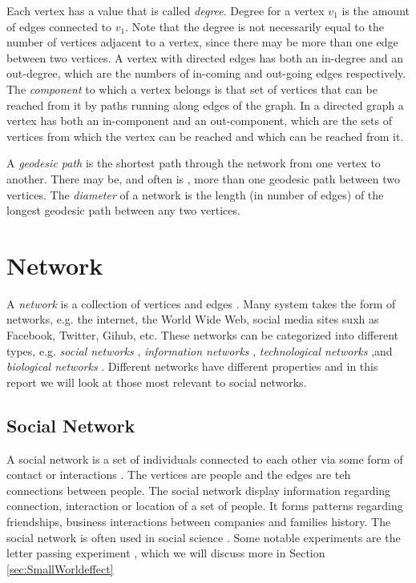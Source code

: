 Each vertex has a value that is called \textit{degree}. Degree for a vertex $v_1$ is the amount of edges connected to $v_1$. Note that the degree is not necessarily equal to the number of vertices adjacent to a vertex, since there may be more than one edge between two vertices. A vertex with directed edges has both an in-degree and an out-degree, which are the numbers of in-coming and out-going edges respectively. The \textit{component} to which a vertex belongs is that set of vertices that can be reached from it by paths running along edges of the graph. In a directed graph a vertex has both an in-component and an out-component, which are the sets of vertices from which the vertex can be reached and which can be reached from it.

A \textit{geodesic path} is the shortest path through the network from one vertex to another. There may be, and often is , more than one geodesic path between two vertices. The \textit{diameter} of a network is the length (in number of edges) of the longest geodesic path between any two vertices. 

\section{Network}
A \textit{network} is a collection of vertices and edges \cite{ComplexNetwork2003}. Many system takes the form of networks, e.g. the internet, the World Wide Web, social media sites suxh as Facebook, Twitter, Gihub, etc. These networks  can be categorized into different types, e.g. \textit{social networks} \cite{ComplexNetwork2003}, \textit{information networks} \cite{ComplexNetwork2003}, \textit{technological networks} \cite{ComplexNetwork2003} ,and \textit{biological networks} \cite{ComplexNetwork2003}. Different networks have different properties and in this report we will look at those most relevant to social networks.

\subsection{Social Network}
A social network is a set of individuals connected to each other via some form of contact or interactions \cite{ComplexNetwork2003}. The vertices are people and the edges are teh connections between people. The social network display information regarding connection, interaction or location of a set of people. It forms patterns regarding friendships, business interactions between companies and families history. The social network is often used in social science \cite{ComplexNetwork2003}. Some notable experiments are the letter passing experiment \cite{smallWorldExperiment1969}, which we will discuss more in Section \ref{sec:SmallWorldeffect} 

